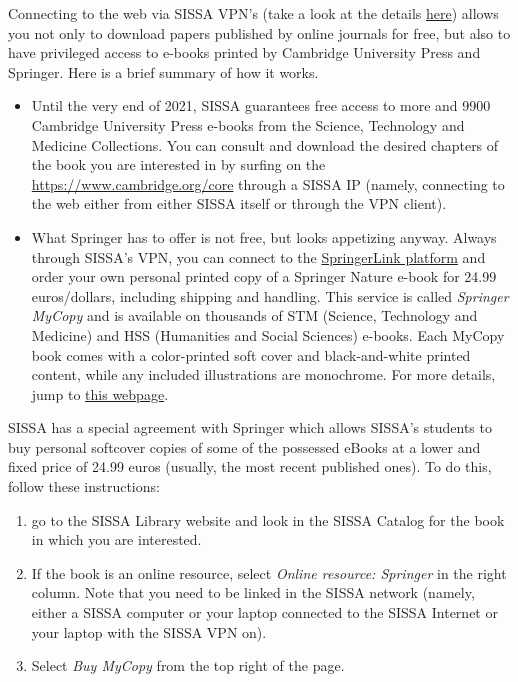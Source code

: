 \documentclass{sissavademecum}
\begin{document}
Connecting to the web via SISSA VPN's (take a look at the details \href{https://www.itcs.sissa.it/services/network/internal/vpnclient}{here}) allows you not only to download papers published by online journals for free, but also to have privileged access to e-books printed by Cambridge University Press and Springer. Here is a brief summary of how it works.
\begin{itemize}
    \item Until the very end of 2021, SISSA guarantees free access to more and 9900 Cambridge University Press e-books from the Science, Technology and Medicine Collections. You can consult and download the desired chapters of the book you are interested in by surfing on the \href{Cambrige Core home page}{https://www.cambridge.org/core} through a SISSA IP (namely, connecting to the web either from either SISSA itself or through the VPN client).
    \item What Springer has to offer is not free, but looks appetizing anyway. Always through SISSA's VPN, you can connect to the \href{https://link.springer.com/search?facet-content-type="Book"}{SpringerLink platform} and order your own personal printed copy of a Springer Nature e-book for 24.99 euros/dollars, including shipping and handling. This service is called \textit{Springer MyCopy} and is available on thousands of STM (Science, Technology and Medicine) and HSS (Humanities and Social Sciences) e-books. Each MyCopy book comes with a color-printed soft cover and black-and-white printed content, while any included illustrations are monochrome. For more details, jump to \href{https://www.springernature.com/gp/librarians/products/ebooks/my-copy}{this webpage}.
\end{itemize}

SISSA has a special agreement with Springer which allows SISSA's students to buy personal softcover copies of some of the possessed eBooks at a lower and fixed price of 24.99 euros (usually, the most recent published ones). To do this, follow these instructions:
\begin{enumerate}
    \item go to the SISSA Library website and look in the SISSA Catalog for the book in which you are interested.
    \item If the book is an online resource, select \emph{Online resource: Springer} in the right column. Note that you need to be linked in the SISSA network (namely, either a SISSA computer or your laptop connected to the SISSA Internet or your laptop with the SISSA VPN on). 
    \item Select \emph{Buy MyCopy} from the top right of the page. 
\end{enumerate}
\end{document}
